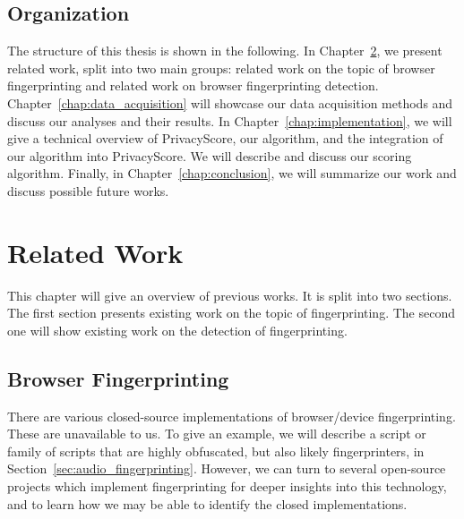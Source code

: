 \documentclass[
    fontsize=12pt,
    headings=small,
    parskip=half,
    bibliography=totoc,
    numbers=noenddot,
    open=any
    ]{scrreprt}
\begin{document}
\section{Organization}
The structure of this thesis is shown in the following.
In Chapter~\ref{chap:related_work}, we present related work, split into two main groups:
related work on the topic of browser fingerprinting and related work on
browser fingerprinting detection.
Chapter~\ref{chap:data_acquisition} will showcase our data acquisition
methods and discuss our analyses and their results.
In Chapter~\ref{chap:implementation}, we will give a technical overview of PrivacyScore,
our algorithm, and the integration of our algorithm into PrivacyScore.
We will describe and discuss our scoring algorithm.
Finally, in Chapter~\ref{chap:conclusion}, we will summarize our work and discuss possible future works.




\chapter{Related Work}
\label{chap:related_work}
This chapter will give an overview of previous works. It is split into two sections.
The first section presents existing work on the topic of fingerprinting. The second one will show existing work on
the detection of fingerprinting.

\section{Browser Fingerprinting}
There are various closed-source implementations of browser/device fingerprinting. These are unavailable to us.
To give an example, we will describe a script or family of scripts that are highly obfuscated, but also likely
fingerprinters, in Section~\ref{sec:audio_fingerprinting}.
However, we can turn to several open-source projects which implement fingerprinting for deeper insights into this technology,
and to learn how we may be able to identify the closed implementations.
\end{document}
